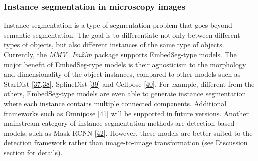 \hypertarget{instance-segmentation-in-microscopy-images}{%
\subsubsection{Instance segmentation in microscopy images}\label{instance-segmentation-in-microscopy-images}}

Instance segmentation is a type of segmentation problem that goes beyond semantic segmentation. The goal is to differentiate not only between different types of objects, but also different instances of the same type of objects. Currently, the \emph{MMV\_Im2Im} package supports EmbedSeg-type models. The major benefit of EmbedSeg-type models is their agnosticism to the morphology and dimensionality of the object instances, compared to other models such as StarDist {[}\protect\hyperlink{ref-tIIG2f8K}{37},\protect\hyperlink{ref-14h90Vfg0}{38}{]}, SplineDist {[}\protect\hyperlink{ref-17Yrl6WGQ}{39}{]} and Cellpose {[}\protect\hyperlink{ref-TugPkOLy}{40}{]}. For example, different from the others, EmbedSeg-type models are even able to generate instance segmentation where each instance contains multiple connected components. Additional frameworks such as Omnipose {[}\protect\hyperlink{ref-lXzmjM5n}{41}{]} will be supported in future versions. Another mainstream category of instance segmentation methods are detection-based models, such as Mask-RCNN {[}\protect\hyperlink{ref-xi8wnibR}{42}{]}. However, these models are better suited to the detection framework rather than image-to-image transformation (see Discussion section for details).

